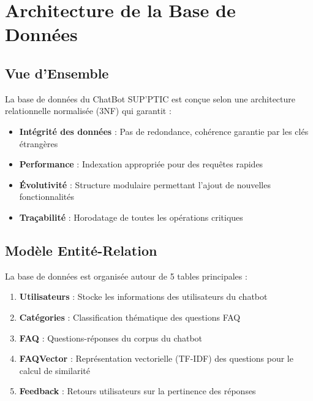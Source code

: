 \documentclass[11pt,a4paper]{article}
\begin{document}
\section{Architecture de la Base de Données}
\label{sec:architecture}

\subsection{Vue d'Ensemble}

La base de données du ChatBot SUP'PTIC est conçue selon une architecture relationnelle normalisée (3NF) qui garantit :

\begin{itemize}
    \item \textbf{Intégrité des données} : Pas de redondance, cohérence garantie par les clés étrangères
    \item \textbf{Performance} : Indexation appropriée pour des requêtes rapides
    \item \textbf{Évolutivité} : Structure modulaire permettant l'ajout de nouvelles fonctionnalités
    \item \textbf{Traçabilité} : Horodatage de toutes les opérations critiques
\end{itemize}

\subsection{Modèle Entité-Relation}

La base de données est organisée autour de 5 tables principales :

\begin{schema}
\begin{enumerate}
    \item \textbf{Utilisateurs} : Stocke les informations des utilisateurs du chatbot
    \item \textbf{Catégories} : Classification thématique des questions FAQ
    \item \textbf{FAQ} : Questions-réponses du corpus du chatbot
    \item \textbf{FAQVector} : Représentation vectorielle (TF-IDF) des questions pour le calcul de similarité
    \item \textbf{Feedback} : Retours utilisateurs sur la pertinence des réponses
\end{enumerate}
\end{schema}
\end{document}
